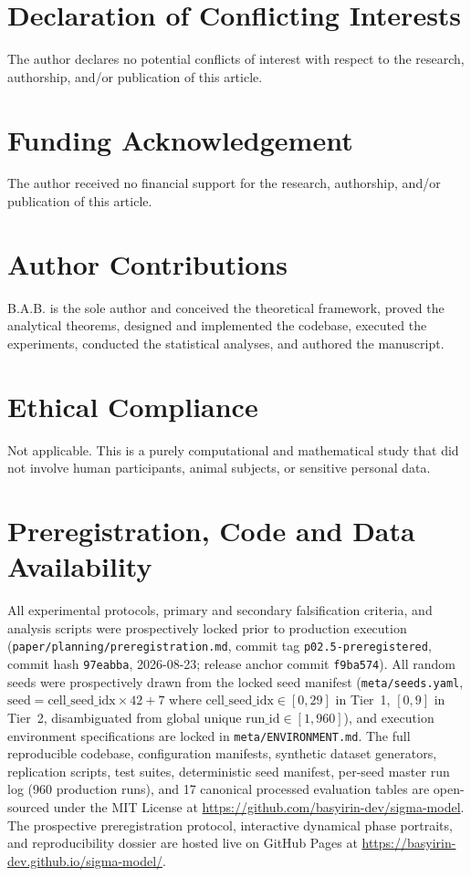 \documentclass{article}
\theoremstyle{plain}
\theoremstyle{definition}
\begin{document}
\section*{Declaration of Conflicting Interests}
The author declares no potential conflicts of interest with respect to the research, authorship, and/or publication of this article.

\section*{Funding Acknowledgement}
The author received no financial support for the research, authorship, and/or publication of this article.

\section*{Author Contributions}
B.A.B. is the sole author and conceived the theoretical framework, proved the analytical theorems, designed and implemented the codebase, executed the experiments, conducted the statistical analyses, and authored the manuscript.

\section*{Ethical Compliance}
Not applicable. This is a purely computational and mathematical study that did not involve human participants, animal subjects, or sensitive personal data.

\section*{Preregistration, Code and Data Availability}
All experimental protocols, primary and secondary falsification criteria, and analysis scripts were prospectively locked prior to production execution (\texttt{paper/planning/preregistration.md}, commit tag \texttt{p02.5-preregistered}, commit hash \texttt{97eabba}, 2026-08-23; release anchor commit \texttt{f9ba574}). All random seeds were prospectively drawn from the locked seed manifest (\texttt{meta/seeds.yaml}, $\text{seed} = \text{cell\_seed\_idx} \times 42 + 7$ where $\text{cell\_seed\_idx} \in [0, 29]$ in Tier~1, $[0, 9]$ in Tier~2, disambiguated from global unique $\text{run\_id} \in [1, 960]$), and execution environment specifications are locked in \texttt{meta/ENVIRONMENT.md}. The full reproducible codebase, configuration manifests, synthetic dataset generators, replication scripts, test suites, deterministic seed manifest, per-seed master run log (960 production runs), and 17 canonical processed evaluation tables are open-sourced under the MIT License at \url{https://github.com/basyirin-dev/sigma-model}. The prospective preregistration protocol, interactive dynamical phase portraits, and reproducibility dossier are hosted live on GitHub Pages at \url{https://basyirin-dev.github.io/sigma-model/}.


\end{document}
